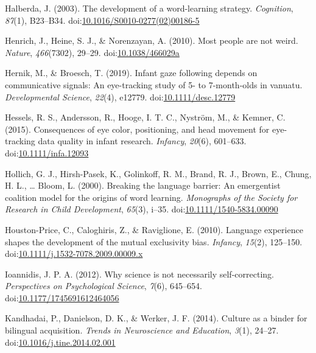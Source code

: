 \documentclass[,man,floatsintext]{apa6}
\begin{document}
\leavevmode\hypertarget{ref-Halberda_2003}{}%
Halberda, J. (2003). The development of a word-learning strategy. \emph{Cognition}, \emph{87}(1), B23--B34. doi:\href{https://doi.org/10.1016/S0010-0277(02)00186-5}{10.1016/S0010-0277(02)00186-5}

\leavevmode\hypertarget{ref-Henrich_etal_2010}{}%
Henrich, J., Heine, S. J., \& Norenzayan, A. (2010). Most people are not weird. \emph{Nature}, \emph{466}(7302), 29--29. doi:\href{https://doi.org/10.1038/466029a}{10.1038/466029a}

\leavevmode\hypertarget{ref-Hernik_Broesch_2019}{}%
Hernik, M., \& Broesch, T. (2019). Infant gaze following depends on communicative signals: An eye-tracking study of 5- to 7-month-olds in vanuatu. \emph{Developmental Science}, \emph{22}(4), e12779. doi:\href{https://doi.org/10.1111/desc.12779}{10.1111/desc.12779}

\leavevmode\hypertarget{ref-Hessels_etal_2015}{}%
Hessels, R. S., Andersson, R., Hooge, I. T. C., Nyström, M., \& Kemner, C. (2015). Consequences of eye color, positioning, and head movement for eye-tracking data quality in infant research. \emph{Infancy}, \emph{20}(6), 601--633. doi:\href{https://doi.org/10.1111/infa.12093}{10.1111/infa.12093}

\leavevmode\hypertarget{ref-Hollich_etal_2000}{}%
Hollich, G. J., Hirsh-Pasek, K., Golinkoff, R. M., Brand, R. J., Brown, E., Chung, H. L., \ldots{} Bloom, L. (2000). Breaking the language barrier: An emergentist coalition model for the origins of word learning. \emph{Monographs of the Society for Research in Child Development}, \emph{65}(3), i--35. doi:\href{https://doi.org/10.1111/1540-5834.00090}{10.1111/1540-5834.00090}

\leavevmode\hypertarget{ref-Houston-Price_etal_2010}{}%
Houston-Price, C., Caloghiris, Z., \& Raviglione, E. (2010). Language experience shapes the development of the mutual exclusivity bias. \emph{Infancy}, \emph{15}(2), 125--150. doi:\href{https://doi.org/10.1111/j.1532-7078.2009.00009.x}{10.1111/j.1532-7078.2009.00009.x}

\leavevmode\hypertarget{ref-Ioannidis_2012}{}%
Ioannidis, J. P. A. (2012). Why science is not necessarily self-correcting. \emph{Perspectives on Psychological Science}, \emph{7}(6), 645--654. doi:\href{https://doi.org/10.1177/1745691612464056}{10.1177/1745691612464056}

\leavevmode\hypertarget{ref-Kandhadai_etal_2014}{}%
Kandhadai, P., Danielson, D. K., \& Werker, J. F. (2014). Culture as a binder for bilingual acquisition. \emph{Trends in Neuroscience and Education}, \emph{3}(1), 24--27. doi:\href{https://doi.org/10.1016/j.tine.2014.02.001}{10.1016/j.tine.2014.02.001}
\end{document}
